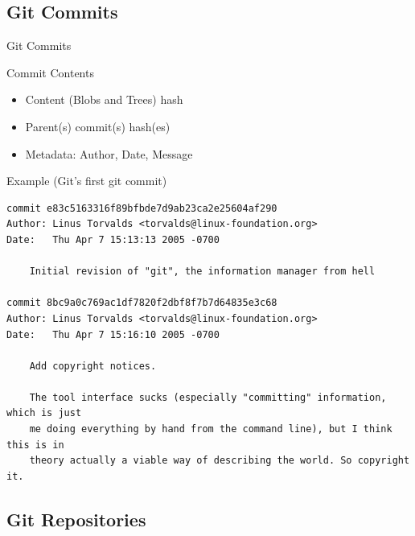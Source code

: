 \documentclass[xetex]{beamer}
\begin{document}
\subsection{Git Commits}

\begin{frame}[fragile]{Git Commits}
  \begin{block}{Commit Contents}
    \begin{itemize}
      \item Content (Blobs and Trees) hash 
      \item Parent(s) commit(s) hash(es)
      \item Metadata: Author, Date, Message
    \end{itemize}
  \end{block}
  \begin{exampleblock}{Example (Git's first git commit)}
  \centering\scriptsize
\begin{verbatim}
commit e83c5163316f89bfbde7d9ab23ca2e25604af290
Author: Linus Torvalds <torvalds@linux-foundation.org>
Date:   Thu Apr 7 15:13:13 2005 -0700

    Initial revision of "git", the information manager from hell

commit 8bc9a0c769ac1df7820f2dbf8f7b7d64835e3c68
Author: Linus Torvalds <torvalds@linux-foundation.org>
Date:   Thu Apr 7 15:16:10 2005 -0700

    Add copyright notices.

    The tool interface sucks (especially "committing" information, which is just
    me doing everything by hand from the command line), but I think this is in
    theory actually a viable way of describing the world. So copyright it.
\end{verbatim}
  \end{exampleblock}
\end{frame}

\subsection{Git Repositories}
\end{document}
